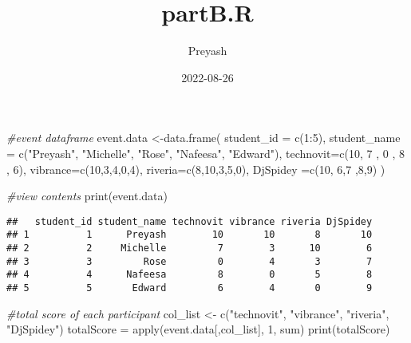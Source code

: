 \documentclass[
]{article}
\title{partB.R}
\author{Preyash}
\date{2022-08-26}
\newenvironment{Shaded}{\begin{snugshade}}{\end{snugshade}}
\newcommand{\AttributeTok}[1]{\textcolor[rgb]{0.77,0.63,0.00}{#1}}
\newcommand{\CommentTok}[1]{\textcolor[rgb]{0.56,0.35,0.01}{\textit{#1}}}
\newcommand{\DecValTok}[1]{\textcolor[rgb]{0.00,0.00,0.81}{#1}}
\newcommand{\FunctionTok}[1]{\textcolor[rgb]{0.00,0.00,0.00}{#1}}
\newcommand{\NormalTok}[1]{#1}
\newcommand{\OtherTok}[1]{\textcolor[rgb]{0.56,0.35,0.01}{#1}}
\newcommand{\SpecialCharTok}[1]{\textcolor[rgb]{0.00,0.00,0.00}{#1}}
\newcommand{\StringTok}[1]{\textcolor[rgb]{0.31,0.60,0.02}{#1}}
\begin{document}
\maketitle

\begin{Shaded}
\begin{Highlighting}[]
\CommentTok{\#event dataframe}
\NormalTok{event.data }\OtherTok{\textless{}{-}}\FunctionTok{data.frame}\NormalTok{(}
  \AttributeTok{student\_id =} \FunctionTok{c}\NormalTok{(}\DecValTok{1}\SpecialCharTok{:}\DecValTok{5}\NormalTok{),}
  \AttributeTok{student\_name =} \FunctionTok{c}\NormalTok{(}\StringTok{"Preyash"}\NormalTok{, }\StringTok{"Michelle"}\NormalTok{, }\StringTok{"Rose"}\NormalTok{, }\StringTok{"Nafeesa"}\NormalTok{, }\StringTok{"Edward"}\NormalTok{),}
  \AttributeTok{technovit=}\FunctionTok{c}\NormalTok{(}\DecValTok{10}\NormalTok{, }\DecValTok{7}\NormalTok{ , }\DecValTok{0}\NormalTok{ , }\DecValTok{8}\NormalTok{ , }\DecValTok{6}\NormalTok{),}
  \AttributeTok{vibrance=}\FunctionTok{c}\NormalTok{(}\DecValTok{10}\NormalTok{,}\DecValTok{3}\NormalTok{,}\DecValTok{4}\NormalTok{,}\DecValTok{0}\NormalTok{,}\DecValTok{4}\NormalTok{),}
  \AttributeTok{riveria=}\FunctionTok{c}\NormalTok{(}\DecValTok{8}\NormalTok{,}\DecValTok{10}\NormalTok{,}\DecValTok{3}\NormalTok{,}\DecValTok{5}\NormalTok{,}\DecValTok{0}\NormalTok{),}
  \AttributeTok{DjSpidey =}\FunctionTok{c}\NormalTok{(}\DecValTok{10}\NormalTok{, }\DecValTok{6}\NormalTok{,}\DecValTok{7}\NormalTok{ ,}\DecValTok{8}\NormalTok{,}\DecValTok{9}\NormalTok{)}
\NormalTok{)}


\CommentTok{\#view contents}
\FunctionTok{print}\NormalTok{(event.data)}
\end{Highlighting}
\end{Shaded}

\begin{verbatim}
##   student_id student_name technovit vibrance riveria DjSpidey
## 1          1      Preyash        10       10       8       10
## 2          2     Michelle         7        3      10        6
## 3          3         Rose         0        4       3        7
## 4          4      Nafeesa         8        0       5        8
## 5          5       Edward         6        4       0        9
\end{verbatim}

\begin{Shaded}
\begin{Highlighting}[]
\CommentTok{\#total score of each participant}
\NormalTok{col\_list }\OtherTok{\textless{}{-}} \FunctionTok{c}\NormalTok{(}\StringTok{"technovit"}\NormalTok{, }\StringTok{"vibrance"}\NormalTok{, }\StringTok{"riveria"}\NormalTok{, }\StringTok{"DjSpidey"}\NormalTok{)}
\NormalTok{totalScore }\OtherTok{=} \FunctionTok{apply}\NormalTok{(event.data[,col\_list], }\DecValTok{1}\NormalTok{, sum)}
\FunctionTok{print}\NormalTok{(totalScore)}
\end{Highlighting}
\end{Shaded}
\end{document}
